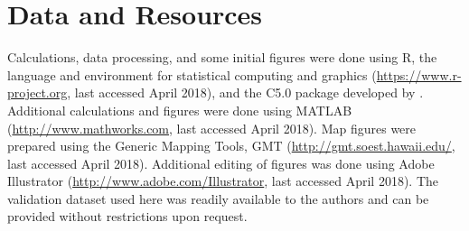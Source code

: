 
\section{Data and Resources}

Calculations, data processing, and some initial figures were done using R, the language and environment for statistical computing and graphics (\url{https://www.r-project.org}, last accessed April 2018), and the C5.0 package developed by \citet{Kuhn_2017_Manual}. Additional calculations and figures were done using MATLAB (\url{http://www.mathworks.com}, last accessed April 2018). Map figures were prepared using the Generic Mapping Tools, GMT (\url{http://gmt.soest.hawaii.edu/}, last accessed April 2018). Additional editing of figures was done using Adobe Illustrator (\url{http://www.adobe.com/Illustrator‎}, last accessed April 2018). The validation dataset used here was readily available to the authors and can be provided without restrictions upon request.
